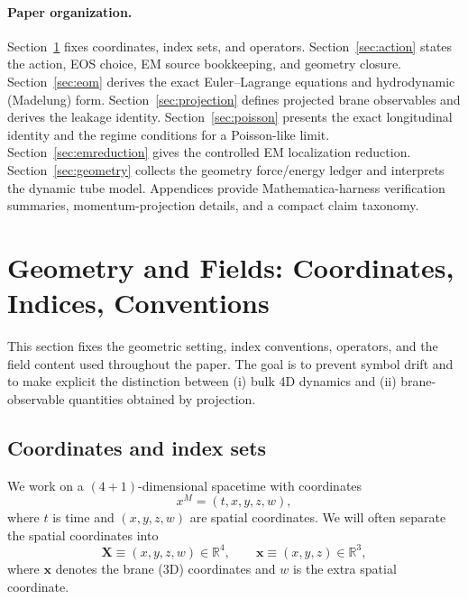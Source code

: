 \documentclass[11pt]{article}
\begin{document}
\paragraph{Paper organization.}
Section~\ref{sec:conventions} fixes coordinates, index sets, and operators. Section~\ref{sec:action} states the action, EOS choice, EM source bookkeeping, and geometry closure. Section~\ref{sec:eom} derives the exact Euler--Lagrange equations and hydrodynamic (Madelung) form. Section~\ref{sec:projection} defines projected brane observables and derives the leakage identity. Section~\ref{sec:poisson} presents the exact longitudinal identity and the regime conditions for a Poisson-like limit. Section~\ref{sec:emreduction} gives the controlled EM localization reduction. Section~\ref{sec:geometry} collects the geometry force/energy ledger and interprets the dynamic tube model. Appendices provide Mathematica-harness verification summaries, momentum-projection details, and a compact claim taxonomy.


\section{Geometry and Fields: Coordinates, Indices, Conventions}
\label{sec:conventions}

This section fixes the geometric setting, index conventions, operators, and the field content used throughout the paper. The goal is to prevent symbol drift and to make explicit the distinction between (i) bulk 4D dynamics and (ii) brane-observable quantities obtained by projection.

\subsection{Coordinates and index sets}
\label{sec:coords}

We work on a $(4+1)$-dimensional spacetime with coordinates
\begin{equation}
x^M = (t, x, y, z, w),
\end{equation}
where $t$ is time and $(x,y,z,w)$ are spatial coordinates. We will often separate the spatial coordinates into
\begin{equation}
\mathbf{X} \equiv (x,y,z,w)\in\mathbb{R}^4,
\qquad
\mathbf{x} \equiv (x,y,z)\in\mathbb{R}^3,
\end{equation}
where $\mathbf{x}$ denotes the brane (3D) coordinates and $w$ is the extra spatial coordinate.
\end{document}
